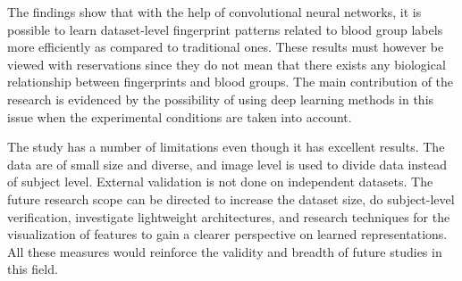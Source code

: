 \documentclass[conference]{IEEEtran}
\begin{document}
The findings show that with the help of convolutional neural networks, it is possible to learn dataset-level fingerprint patterns related to blood group labels more efficiently as compared to traditional ones. These results must however be viewed with reservations since they do not mean that there exists any biological relationship between fingerprints and blood groups. The main contribution of the research is evidenced by the possibility of using deep learning methods in this issue when the experimental conditions are taken into account.

The study has a number of limitations even though it has excellent results. The data are of small size and diverse, and image level is used to divide data instead of subject level. External validation is not done on independent datasets. The future research scope can be directed to increase the dataset size, do subject-level verification, investigate lightweight architectures, and research techniques for the visualization of features to gain a clearer perspective on learned representations. All these measures would reinforce the validity and breadth of future studies in this field.
\end{document}

